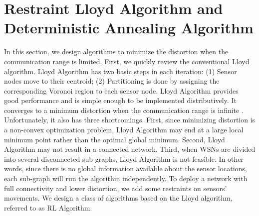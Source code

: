 \documentclass[journal,draftcls,onecolumn,12pt,twoside, narroweqnarray]{IEEEtran}
\begin{document}
\section{Restraint Lloyd Algorithm and Deterministic Annealing Algorithm}
In this section, we design algorithms to minimize the distortion when the communication range is limited.
First, we quickly review the conventional Lloyd algorithm. Lloyd Algorithm has two basic steps in each iteration: (1) Sensor nodes move to their centroid; (2) Partitioning is done by assigning the corresponding Voronoi region to each sensor node. Lloyd Algorithm provides good performance and is simple enough to be implemented distributively. It converges to a minimum distortion when the communication range is infinite \cite{SD}. Unfortunately, it also has three shortcomings. First, since minimizing distortion is a non-convex optimization problem, Lloyd Algorithm may end at a large local minimum point rather than the optimal global minimum. Second, Lloyd Algorithm may not result in a connected network. Third, when WSNs are divided into several disconnected sub-graphs, Lloyd Algorithm is not feasible. In other words, since there is no global information available about the sensor locations, each sub-graph will run the algorithm independently. To deploy a network with full connectivity and lower distortion, we add some restraints on sensors' movements. We design a class of algorithms based on the Lloyd algorithm, referred to as RL Algorithm.
\end{document}
